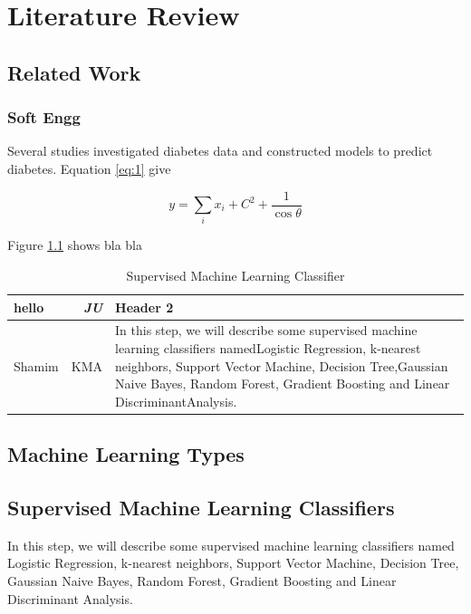 
\chapter{Literature Review}
\label{chap:2}

\section{Related Work}

\subsection{Soft Engg}

 Several studies investigated diabetes data and constructed models to predict diabetes. Equation \ref{eq:1} give

\begin{equation} \label{eq:1}
    y=\sum_i x_i+C^2+\frac{1}{\cos{\theta}}
\end{equation}

Figure \ref{tab:sub} shows bla bla
\begin{table}[ht!]
    \centering
     \caption{Supervised Machine Learning Classifier}
     \vspace{2pt}
    \begin{tabular}{lrp{3in}}
    \hline
        \textbf{hello} & \textit{JU} & Header 2  \\ \hline
         Shamim & KMA & In this step, we will describe some supervised machine learning classifiers namedLogistic Regression, k-nearest neighbors, Support Vector Machine, Decision Tree,Gaussian Naive Bayes, Random Forest, Gradient Boosting and Linear DiscriminantAnalysis. \\  \hline
    \end{tabular}
    \label{tab:sub}
\end{table}

\section{ Machine Learning Types}

\section{Supervised Machine Learning Classifiers}

In this step, we will describe some supervised machine learning classifiers named Logistic Regression, k-nearest neighbors, Support Vector Machine, Decision Tree, Gaussian Naive Bayes, Random Forest, Gradient Boosting and Linear Discriminant Analysis. 

